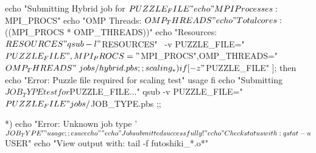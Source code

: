         echo "Submitting Hybrid job for $PUZZLE_FILE"
        echo "MPI Processes: $MPI_PROCS"
        echo "OMP Threads: $OMP_THREADS"
        echo "Total cores: $((MPI_PROCS * OMP_THREADS))"
        echo "Resources: $RESOURCES"
        
        qsub -l "$RESOURCES" \
             -v PUZZLE_FILE="$PUZZLE_FILE",MPI_PROCS="$MPI_PROCS",OMP_THREADS="$OMP_THREADS" \
             jobs/hybrid.pbs
        ;;
        
    scaling_*)
        if [ -z "$PUZZLE_FILE" ]; then
            echo "Error: Puzzle file required for scaling test"
            usage
        fi
        echo "Submitting ${JOB_TYPE} test for $PUZZLE_FILE..."
        qsub -v PUZZLE_FILE="$PUZZLE_FILE" jobs/${JOB_TYPE}.pbs
        ;;
        
    *)
        echo "Error: Unknown job type '$JOB_TYPE'"
        usage
        ;;
esac

echo ""
echo "Job submitted successfully!"
echo "Check status with: qstat -u $USER"
echo "View output with: tail -f futoshiki_*.o*"